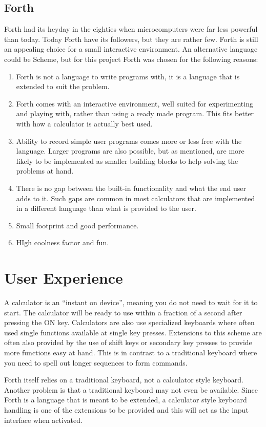\documentclass[a4paper]{article}
\begin{document}
\subsection{Forth}
Forth had its heyday in the eighties when microcomputers were far less powerful than today.
Today Forth have its followers, but they are rather few. Forth is still an appealing choice for a small interactive environment. An alternative language could be Scheme, but for this project Forth was chosen for the following reasons:
\begin{enumerate}
\item Forth is not a language to write programs with, it is a language that is extended to suit the problem.
\item Forth comes with an interactive environment, well suited for experimenting and playing with, rather than using a ready made program.  This fits better with how a calculator is actually best used.
\item Ability to record simple user programs comes more or less free with the language. Larger programs are also possible, but as mentioned, are more likely to be implemented as smaller building blocks to help solving the problems at hand.
\item There is no gap between the built-in functionality and what the end user adds to it. Such gaps are common in most calculators that are implemented in a different language than what is provided to the user.
\item Small footprint and good performance.
\item HIgh coolness factor and fun.
\end{enumerate}

\section{User Experience}
A calculator is an ``instant on device'', meaning you do not need to wait for it to start. The calculator will be ready to use within a fraction of a second after pressing the ON key. Calculators are also use specialized keyboards where often used single functions available at single key presses. Extensions to this scheme are often also provided by the use of shift keys or secondary key presses to provide more functions easy at hand. This is in contrast to a traditional keyboard where you need to spell out longer sequences to form commands.

Forth itself relies on a traditional keyboard, not a calculator style keyboard. Another problem is that a traditional keyboard may not even be available. Since Forth is a language that is meant to be extended, a calculator style keyboard handling is one of the extensions to be provided and this will act as the input interface when activated.
\end{document}

